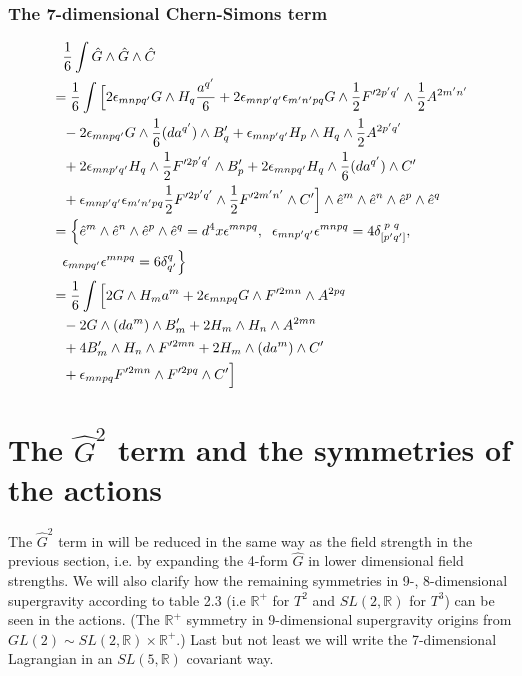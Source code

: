 \subsubsection{The 7-dimensional Chern-Simons term}
\begin{align}
&\phantom{=}{1 \over 6} \int \hat{G} \wedge \hat{G} \wedge \hat{C} \nonumber \\
&={1 \over 6} \int \Big{[} 2 \epsilon_{mnpq'} G \wedge H_q {a^{q'} \over 6} +2 \epsilon_{mnp'q'} \epsilon_{m'n'pq} G \wedge {1 \over 2} F'^{2p'q'} \wedge {1 \over 2} A^{2m'n'} \nonumber \\
&\phantom{=}-2 \epsilon_{mnpq'} G \wedge {1 \over 6}(da^{q'}) \wedge B'_q +\epsilon_{mnp'q'} H_p \wedge H_q \wedge {1 \over 2} A^{2p'q'} \nonumber \\
&\phantom{=}+2 \epsilon_{mnp'q'} H_q \wedge {1 \over 2}F'^{2p'q'} \wedge B'_p +2 \epsilon_{mnpq'} H_q \wedge {1 \over 6}(da^{q'}) \wedge C' \nonumber \\
&\phantom{=} +\epsilon_{mnp'q'} \epsilon_{m'n'pq} {1 \over 2}F'^{2p'q'} \wedge {1 \over 2}F'^{2m'n'} \wedge C' \Big{]} \wedge \hat{e}^m \wedge \hat{e}^n \wedge \hat{e}^p \wedge \hat{e}^q \nonumber \\
&=\Big{\{} \hat{e}^m \wedge \hat{e}^n \wedge \hat{e}^p \wedge \hat{e}^q= d^4 x {\epsilon}^{mnpq},\hspace{0.2cm} {\epsilon}_{mnp'q'} {\epsilon}^{mnpq} = 4\delta^{ \phantom{[} p \phantom{'} q}_{[p'q']} ,\nonumber \\
&\phantom{=}{\epsilon}_{mnpq'}{\epsilon}^{mnpq} = 6 \delta^q_{q'} \Big{\}} \nonumber \\
&={1 \over 6} \int \Big{[} 2G \wedge H_m a^{m} +2\epsilon_{mnpq}G \wedge F'^{2mn} \wedge A^{2pq} \nonumber \\
&\phantom{=}-2G \wedge (da^{m}) \wedge B'_m +2H_m \wedge H_n \wedge A^{2mn} \nonumber \\
&\phantom{=}+4 B'_m \wedge H_n \wedge F'^{2mn} +2 H_m \wedge (da^{m}) \wedge C' \nonumber \\
&\phantom{=}+ \epsilon_{mnpq} F'^{2mn} \wedge F'^{2pq} \wedge C' \Big{]}
\end{align}

\section{The $\hat{G}^2$ term and the symmetries of the actions}
The $\hat{G}^2$ term in  will be reduced in the same way as the field strength in the previous section, i.e. by expanding the 4-form $\hat{G}$ 
in lower dimensional field strengths. We will also clarify how the remaining symmetries in 9-, 8-dimensional 
supergravity according to table 2.3 (i.e ${\mathbb R}^+$ for $T^2$ and $SL(2,{\mathbb R})$ for $T^3$) can be seen in the actions. 
(The ${\mathbb R}^+$ symmetry in 9-dimensional supergravity origins from $GL(2) \sim SL(2,{\mathbb R}) \times {\mathbb R}^+$.) Last but not least 
we will write the 7-dimensional Lagrangian in an $SL(5,{\mathbb R})$ covariant way.

